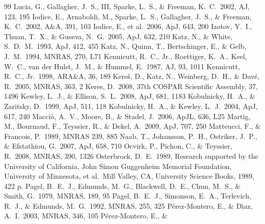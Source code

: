 \documentclass[12pt,preprint]{aastex}
\begin{document}
\begin{thebibliography}{99}
  Lucia, G., Gallagher, J.~S., III, Sparke, L.~S., \& Freeman,
  K.~C.\ 2002, AJ, 123, 195
 Iodice, E., Arnaboldi, M.,
  Sparke, L.~S., Gallagher, J.~S., \& Freeman, K.~C.\ 2002, A\&A, 391,
  103
 Iodice, E., et al.\ 2006, ApJ, 643, 200
 Izotov, Y.~I., Thuan,
T.~X., \& Guseva, N.~G.\ 2005, ApJ, 632, 210
 Katz, N., \& White, S.~D.~M.\ 1993, ApJ, 412, 455
 Katz, N., Quinn, T.,
Bertschinger, E., \& Gelb, J.~M.\ 1994, MNRAS, 270, L71
 Kennicutt, R.~C.,
Jr., Roettiger, K.~A., Keel, W.~C., van der Hulst, J.~M.,
\& Hummel, E.\ 1987, AJ, 93, 1011
 Kennicutt, R.~C., Jr.\ 1998, ARA\&A,
  36, 189
 Kere{\v s}, D.,
Katz, N., Weinberg, D.~H., \& Dav{\'e}, R.\ 2005, MNRAS, 363, 2
 Keres, D.\ 2008, 37th COSPAR Scientific
  Assembly, 37, 1496
 Kewley, L.~J., \& Ellison,
S.~L.\ 2008, ApJ, 681, 1183
 Kobulnicky, H.~A., \& Zaritsky, D.\
1999, ApJ, 511, 118
 Kobulnicky, H.~A., \&
Kewley, L.~J.\ 2004, ApJ, 617, 240
 Macci{\`o}, A.~V.,
Moore, B., \& Stadel, J.\ 2006, ApJL, 636, L25
 Martig, M., Bournaud,
F., Teyssier, R., \& Dekel, A.\ 2009, ApJ, 707, 250
 Matteucci, F., \&
  Francois, P.\ 1989, MNRAS 239, 885
 Naab, T., Johansson,
P.~H., Ostriker, J.~P., \& Efstathiou, G.\ 2007, ApJ, 658, 710
 Ocvirk, P., Pichon, C.,
\& Teyssier, R.\ 2008, MNRAS, 390, 1326
 Osterbrock, D.~E.\ 1989,
Research supported by the University of California, John Simon
Guggenheim Memorial Foundation, University of Minnesota, et
al.~Mill Valley, CA, University Science Books, 1989, 422 p.
 Pagel, B.~E.~J., Edmunds,
M.~G., Blackwell, D.~E., Chun, M.~S., \& Smith, G.\ 1979, MNRAS,
189, 95
 Pagel, B.~E.~J.,
Simonson, E.~A., Terlevich, R.~J., \& Edmunds, M.~G.\ 1992, MNRAS,
255, 325
 P{\'e}rez-Montero, E., \&
D{\'{\i}}az, A.~I.\ 2003, MNRAS, 346, 105
 P{\'e}rez-Montero, E., \&

\end{thebibliography}
\end{document}
